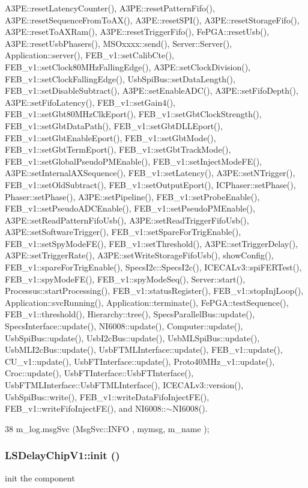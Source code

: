 A3PE::resetLatencyCounter(), A3PE::resetPatternFifo(), A3PE::resetSequenceFromToAX(), A3PE::resetSPI(), A3PE::resetStorageFifo(), A3PE::resetToAXRam(), A3PE::resetTriggerFifo(), FePGA::resetUsb(), A3PE::resetUsbPhasers(), MSOxxxx::send(), Server::Server(), Application::server(), FEB\_\-v1::setCalibCte(), FEB\_\-v1::setClock80MHzFallingEdge(), A3PE::setClockDivision(), FEB\_\-v1::setClockFallingEdge(), UsbSpiBus::setDataLength(), FEB\_\-v1::setDisableSubtract(), A3PE::setEnableADC(), A3PE::setFifoDepth(), A3PE::setFifoLatency(), FEB\_\-v1::setGain4(), FEB\_\-v1::setGbt80MHzClkEport(), FEB\_\-v1::setGbtClockStrength(), FEB\_\-v1::setGbtDataPath(), FEB\_\-v1::setGbtDLLEport(), FEB\_\-v1::setGbtEnableEport(), FEB\_\-v1::setGbtMode(), FEB\_\-v1::setGbtTermEport(), FEB\_\-v1::setGbtTrackMode(), FEB\_\-v1::setGlobalPseudoPMEnable(), FEB\_\-v1::setInjectModeFE(), A3PE::setInternalAXSequence(), FEB\_\-v1::setLatency(), A3PE::setNTrigger(), FEB\_\-v1::setOldSubtract(), FEB\_\-v1::setOutputEport(), ICPhaser::setPhase(), Phaser::setPhase(), A3PE::setPipeline(), FEB\_\-v1::setProbeEnable(), FEB\_\-v1::setPseudoADCEnable(), FEB\_\-v1::setPseudoPMEnable(), A3PE::setReadPatternFifoUsb(), A3PE::setReadTriggerFifoUsb(), A3PE::setSoftwareTrigger(), FEB\_\-v1::setSpareForTrigEnable(), FEB\_\-v1::setSpyModeFE(), FEB\_\-v1::setThreshold(), A3PE::setTriggerDelay(), A3PE::setTriggerRate(), A3PE::setWriteStorageFifoUsb(), showConfig(), FEB\_\-v1::spareForTrigEnable(), SpecsI2c::SpecsI2c(), ICECALv3::spiFERTest(), FEB\_\-v1::spyModeFE(), FEB\_\-v1::spyModeSeq(), Server::start(), Processus::startProcessing(), FEB\_\-v1::statusRegister(), FEB\_\-v1::stopInjLoop(), Application::svcRunning(), Application::terminate(), FePGA::testSequence(), FEB\_\-v1::threshold(), Hierarchy::tree(), SpecsParallelBus::update(), SpecsInterface::update(), NI6008::update(), Computer::update(), UsbSpiBus::update(), UsbI2cBus::update(), UsbMLSpiBus::update(), UsbMLI2cBus::update(), UsbFTMLInterface::update(), FEB\_\-v1::update(), CU\_\-v1::update(), UsbFTInterface::update(), Proto40MHz\_\-v1::update(), Croc::update(), UsbFTInterface::UsbFTInterface(), UsbFTMLInterface::UsbFTMLInterface(), ICECALv3::version(), UsbSpiBus::write(), FEB\_\-v1::writeDataFifoInjectFE(), FEB\_\-v1::writeFifoInjectFE(), and NI6008::$\sim$NI6008().


\begin{DoxyCode}
38 { m_log.msgSvc (MsgSvc::INFO    , mymsg, m_name ); }
\end{DoxyCode}
\hypertarget{classLSDelayChipV1_af8bc9c84a1b65cbc2176fdbc349e829c}{
\subsubsection[{init}]{ LSDelayChipV1::init ()}}
\label{classLSDelayChipV1_af8bc9c84a1b65cbc2176fdbc349e829c}
init the component

